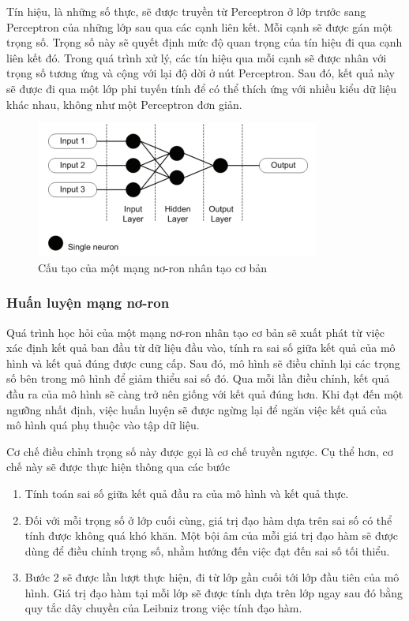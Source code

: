 Tín hiệu, là những số thực, sẽ được truyền từ Perceptron ở lớp trước sang Perceptron của những lớp sau qua các cạnh liên kết. Mỗi cạnh sẽ được gán một trọng số. Trọng số này sẽ quyết định mức độ quan trọng của tín hiệu đi qua cạnh liên kết đó. Trong quá trình xử lý, các tín hiệu qua mỗi cạnh sẽ được nhân với trọng số tương ứng và cộng với lại độ dời ở nút Perceptron. Sau đó, kết quả này sẽ được đi qua một lớp phi tuyến tính để có thể thích ứng với nhiều kiểu dữ liệu khác nhau, không như một Perceptron đơn giản.
\begin{figure}[H]
    \centering
    \includegraphics{pics/Chapter3/basicNN.png}
    \caption{Cấu tạo của một mạng nơ-ron nhân tạo cơ bản \cite{krenker2011introduction}}
    \label{fig:enter-label}
\end{figure}
\subsubsection*{Huấn luyện mạng nơ-ron}
Quá trình học hỏi của một mạng nơ-ron nhân tạo cơ bản sẽ xuất phát từ việc xác định kết quả ban đầu từ dữ liệu đầu vào, tính ra sai số giữa kết quả của mô hình và kết quả đúng được cung cấp. Sau đó, mô hình sẽ điều chỉnh lại các trọng số bên trong mô hình để giảm thiểu sai số đó. Qua mỗi lần điều chỉnh, kết quả đầu ra của mô hình sẽ càng trở nên giống với kết quả đúng hơn. Khi đạt đến một ngưỡng nhất định, việc huấn luyện sẽ được ngừng lại để ngăn việc kết quả của mô hình quá phụ thuộc vào tập dữ liệu.

Cơ chế điều chỉnh trọng số này được gọi là cơ chế truyền ngược. Cụ thể hơn, cơ chế này sẽ được thực hiện thông qua các bước
\begin{enumerate}
    \item Tính toán sai số giữa kết quả đầu ra của mô hình và kết quả thực.
    \item Đối với mỗi trọng số ở lớp cuối cùng, giá trị đạo hàm dựa trên sai số có thể tính được không quá khó khăn. Một bội âm của mỗi giá trị đạo hàm sẽ được dùng để điều chỉnh trọng số, nhằm hướng đến việc đạt đến sai số tối thiểu.
    \item Bước 2 sẽ được lần lượt thực hiện, đi từ lớp gần cuối tới lớp đầu tiên của mô hình. Giá trị đạo hàm tại mỗi lớp sẽ được tính dựa trên lớp ngay sau đó bằng quy tắc dây chuyền của Leibniz trong việc tính đạo hàm.
\end{enumerate}

